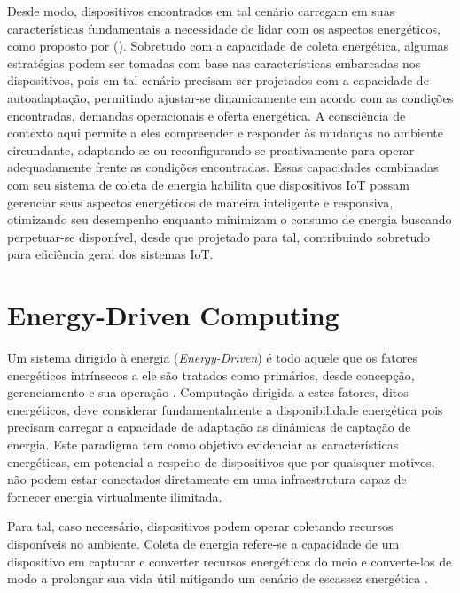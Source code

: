Desde modo, dispositivos encontrados em tal cenário carregam em suas características fundamentais a necessidade de lidar com os aspectos energéticos, como proposto por \citeauthor{kansal_power_2007} (\citeyear{kansal_power_2007}). Sobretudo com a capacidade de coleta energética, algumas estratégias podem ser tomadas com base nas características embarcadas nos dispositivos, pois em tal cenário precisam ser projetados com a capacidade de autoadaptação, permitindo ajustar-se dinamicamente em acordo com as condições encontradas, demandas operacionais e oferta energética. A consciência de contexto aqui permite a eles compreender e responder às mudanças no ambiente circundante, adaptando-se ou reconfigurando-se proativamente para operar adequadamente frente as condições encontradas. Essas capacidades combinadas com seu sistema de coleta de energia habilita que dispositivos IoT possam gerenciar seus aspectos energéticos de maneira inteligente e responsiva, otimizando seu desempenho enquanto minimizam o consumo de energia buscando perpetuar-se disponível, desde que projetado para tal, contribuindo sobretudo para eficiência geral dos sistemas IoT.





\section{Energy-Driven Computing}
\label{cap2:energyDriven}

Um sistema dirigido à energia (\textit{Energy-Driven}) é todo aquele que os fatores energéticos intrínsecos a ele são tratados como primários, desde concepção, gerenciamento e sua operação \cite{merrett_energy-driven_2017}. Computação dirigida a estes fatores, ditos energéticos, deve considerar fundamentalmente a disponibilidade energética pois precisam carregar a capacidade de adaptação as dinâmicas de captação de energia. Este paradigma tem como objetivo evidenciar as características energéticas, em potencial a respeito de dispositivos que por quaisquer motivos, não podem estar conectados diretamente em uma infraestrutura capaz de fornecer energia virtualmente ilimitada. 

Para tal, caso necessário, dispositivos podem operar coletando recursos disponíveis no ambiente. Coleta de energia refere-se a capacidade de um dispositivo em capturar e converter recursos energéticos do meio e converte-los de modo a prolongar sua vida útil mitigando um cenário de escassez energética \cite{sudevalayam_energy_2011}. 

